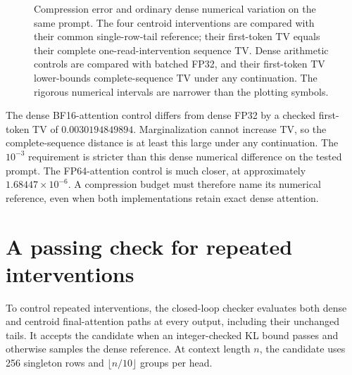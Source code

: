 \documentclass[10pt]{article}
\theoremstyle{definition}\newtheorem{definition}[theorem]{Definition}
\begin{document}
\begin{figure}[t]
\centering
{}
\caption{Compression error and ordinary dense numerical variation on the same prompt. The four centroid interventions are compared with their common single-row-tail reference; their first-token TV equals their complete one-read-intervention sequence TV. Dense arithmetic controls are compared with batched FP32, and their first-token TV lower-bounds complete-sequence TV under any continuation. The rigorous numerical intervals are narrower than the plotting symbols.}
\label{fig:tv}
\end{figure}

The dense BF16-attention control differs from dense FP32 by a checked first-token TV of $0.0030194849894$. Marginalization cannot increase TV, so the complete-sequence distance is at least this large under any continuation. The $10^{-3}$ requirement is stricter than this dense numerical difference on the tested prompt. The FP64-attention control is much closer, at approximately $1.68447\times10^{-6}$. A compression budget must therefore name its numerical reference, even when both implementations retain exact dense attention.

\section{A passing check for repeated interventions}
\label{sec:gate}
To control repeated interventions, the closed-loop checker evaluates both dense and centroid final-attention paths at every output, including their unchanged tails. It accepts the candidate when an integer-checked KL bound passes and otherwise samples the dense reference. At context length $n$, the candidate uses 256 singleton rows and $\lfloor n/10\rfloor$ groups per head.
\end{document}
